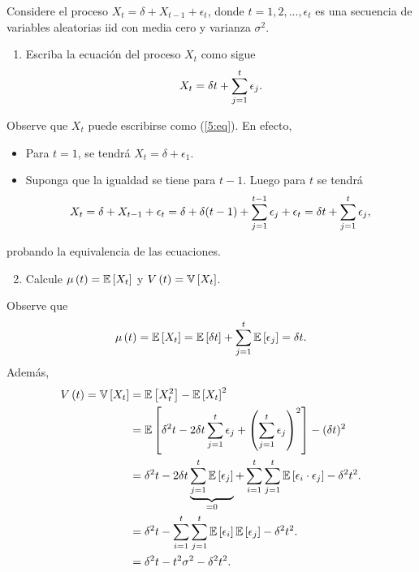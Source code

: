\documentclass[../main.tex]{subfiles}
\begin{document}
    \begin{enunciado}
        Considere el proceso $X_t = \delta + X_{t-1} + \epsilon_t$, donde $t = 1,2,...,\epsilon_t$ es una secuencia de variables aleatorias iid con media cero y varianza $\sigma^2$.
        \begin{enumerate}
            \item Escriba la ecuación del proceso $X_t$ como sigue
                \begin{align}
                    \label{5:eq}
                	X_t = \delta t + \sum_{j = 1}^{t} \epsilon_j.
                \end{align}
        \end{enumerate}

    \end{enunciado}
    \begin{demostracion}
        Observe que $X_t$ puede escribirse como (\ref{5:eq}). En efecto,
            \begin{itemize}
            	\item Para $t = 1$, se tendrá $X_t = \delta + \epsilon_1$.
            	\item Suponga que la igualdad se tiene para $t - 1$. Luego para $t$ se tendrá
                    \begin{align*}
                    	X_t = \delta + X_{t-1} + \epsilon_t = \delta + \delta (t-1) + \sum_{j = 1}^{t-1} \epsilon_j + \epsilon_t = \delta t + \sum_{j = 1}^{t} \epsilon_j,
                    \end{align*}
            \end{itemize}
        probando la equivalencia de las ecuaciones.
    \end{demostracion}
    \vspace{1em}
    \begin{enunciado}
    	\begin{enumerate}
            \setcounter{enumi}{1}
    		\item Calcule $\mu\left( t \right) = \mathbb{E} \left[ X_t \right]$ y $V\left( t \right) = \mathbb{V} \left[ X_t \right]$.
    	\end{enumerate}
    \end{enunciado}
    \begin{demostracion}
    	Observe que
    	\begin{align*}
    		\mu\left( t \right) = \mathbb{E} \left[ X_t \right] = \mathbb{E} \left[ \delta t \right] + \sum_{j = 1}^{t} \mathbb{E} \left[ \epsilon_j \right] = \delta t.
    	\end{align*}
    	Además,
    	\begin{align*}
    		V\left( t \right) = \mathbb{V} \left[ X_t \right] &= \mathbb{E} \left[ X_t^2 \right] - \mathbb{E} \left[ X_t \right]^2\\
    		&= \mathbb{E} \left[ \delta^2 t - 2 \delta t \sum_{j = 1}^{t} \epsilon_j + \left( \sum_{j = 1}^{t} \epsilon_j \right)^2 \right] - (\delta t)^2\\
    		&= \delta^2 t - 2\delta t \underbrace{\sum_{j = 1}^{t} \mathbb{E} \left[ \epsilon_j \right]}_{= 0} + \sum_{i = 1}^{t} \sum_{j = 1}^{t} \mathbb{E} \left[ \epsilon_i \cdot \epsilon_j \right] - \delta^2 t^2.\\
    		&= \delta^2 t - \sum_{i = 1}^{t} \sum_{j = 1}^{t} \mathbb{E} \left[ \epsilon_i \right]\mathbb{E} \left[ \epsilon_j \right] - \delta^2 t^2.\\
    		&= \delta^2 t - t^2 \sigma^2 - \delta^2 t^2.
    	\end{align*}
    \end{demostracion}
\end{document}
